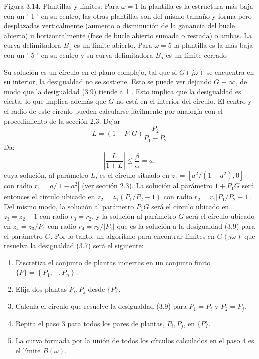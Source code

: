 Figura 3.14. Plantillas y límites: Para $\omega=1$ la plantilla es la estructura más baja con un ' 1 ' en su centro, las otras plantillas son del mismo tamaño y forma pero desplazadas verticalmente (aumento o disminución de la ganancia del bucle abierto) u horizontalmente (fase de bucle abierto sumada o restada) o ambas. La curva delimitadora $B_{1}$ es un límite abierto. Para $\omega=5$ la plantilla es la más baja con un ' 5 ' en su centro y su curva delimitadora $B_{5}$ es un límite cerrado

Su solución es un círculo en el plano complejo, tal que si $G(j \omega)$ se encuentra en su interior, la desigualdad no se sostiene. Esto se puede ver dejando $G \equiv \infty$, de modo que la desigualdad (3.9) tiende a 1 . Esto implica que la desigualdad es cierta, lo que implica además que $G$ no está en el interior del círculo. El centro y el radio de este círculo pueden calcularse fácilmente por analogía con el procedimiento de la sección 2.3. Dejar
$$
L=\left(1+P_{1} G\right) \frac{P_{2}}{P_{1}-P_{2}}
$$
Da:
$$
\left|\frac{L}{1+L}\right| \leq \frac{\beta}{\alpha}=a,
$$
cuya solución, al parámetro $L$, es el círculo situado en $z_{1}=\left[a^{2} /\left(1-a^{2}\right), 0\right]$ con radio $r_{1}=a /\left|1-a^{2}\right|$ (ver sección 2.3). La solución al parámetro $1+P_{1} G$ será entonces el círculo ubicado en $z_{2}=z_{1}\left(P_{1} / P_{2}-1\right)$ con radio $r_{2}=r_{1}\left| P_{1} / P_{2}-1\right|$. Del mismo modo, la solución al parámetro $P_{1} G$ será el círculo ubicado en $z_{3}=z_{2}-1$ con radio $r_{3}=r_{2}$, y la solución al parámetro $G$ será el círculo ubicado en $z_{4}=z_{3} / P_{1}$ con radio $r_{4}=r_{3} /\left| P_{1}\right|$ que es la solución a la desigualdad (3.9) para el parámetro $G$. Por lo tanto, un algoritmo para encontrar límites en $G(j \omega)$ que resuelva la desigualdad (3.7) será el siguiente:

\begin{enumerate}
  \item Discretiza el conjunto de plantas inciertas en un conjunto finito $\{P\}=\left\{P_{1}, \cdots, P_{n}\right\}$.

  \item Elija dos plantas $P_{i}, P_{j}$ desde $\{P\}$.

  \item Calcula el círculo que resuelve la desigualdad (3.9) para $P_{1}=P_{i}$ y $P_{2}=P_{j}$.

  \item Repita el paso 3 para todos los pares de plantas, $P_{i}, P_{j}$, en $\{P\}$.

  \item La curva formada por la unión de todos los círculos calculados en el paso 4 es el límite $B(\omega)$.

\end{enumerate}
